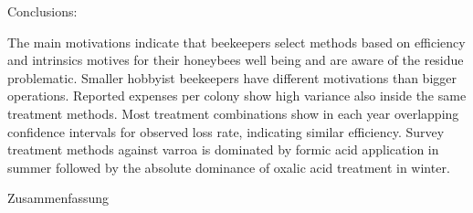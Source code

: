 Conclusions:

The main motivations indicate that beekeepers select methods based on efficiency and intrinsics motives for their honeybees well being and are aware of the residue problematic. Smaller hobbyist beekeepers have different motivations than bigger operations. Reported expenses per colony show high variance also inside the same treatment methods. Most treatment combinations show in each year overlapping confidence intervals for observed loss rate, indicating similar efficiency. Survey treatment methods against varroa is dominated by formic acid application in summer followed by the absolute dominance of oxalic acid treatment in winter.

\vspace*{20mm}

{Zusammenfassung}
\label{sec:Zusammenfassung}